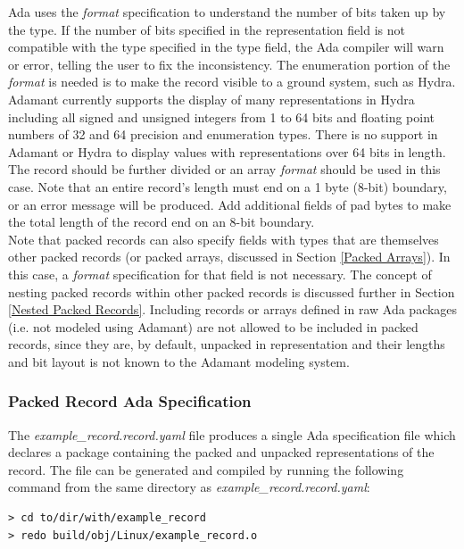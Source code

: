 Ada uses the \textit{format} specification to understand the number of bits taken up by the type. If the number of bits specified in the representation field is not compatible with the type specified in the type field, the Ada compiler will warn or error, telling the user to fix the inconsistency. The enumeration portion of the \textit{format} is needed is to make the record visible to a ground system, such as Hydra. Adamant currently supports the display of many representations in Hydra including all signed and unsigned integers from 1 to 64 bits and floating point numbers of 32 and 64 precision and enumeration types. There is no support in Adamant or Hydra to display values with representations over 64 bits in length. The record should be further divided or an array \textit{format} should be used in this case. Note that an entire record's length must end on a 1 byte (8-bit) boundary, or an error message will be produced. Add additional fields of pad bytes to make the total length of the record end on an 8-bit boundary. \\

Note that packed records can also specify fields with types that are themselves other packed records (or packed arrays, discussed in Section \ref{Packed Arrays}). In this case, a \textit{format} specification for that field is not necessary. The concept of nesting packed records within other packed records is discussed further in Section \ref{Nested Packed Records}. Including records or arrays defined in raw Ada packages (i.e. not modeled using Adamant) are not allowed to be included in packed records, since they are, by default, unpacked in representation and their lengths and bit layout is not known to the Adamant modeling system.

\subsubsection{Packed Record Ada Specification} \label{Packed Record Ada Specification}

The \textit{example\_record.record.yaml} file produces a single Ada specification file which declares a package containing the packed and unpacked representations of the record. The file can be generated and compiled by running the following command from the same directory as \textit{example\_record.record.yaml}:

\vspace{5mm} %
\begin{verbatim}
> cd to/dir/with/example_record
> redo build/obj/Linux/example_record.o
\end{verbatim}
\vspace{5mm} %


